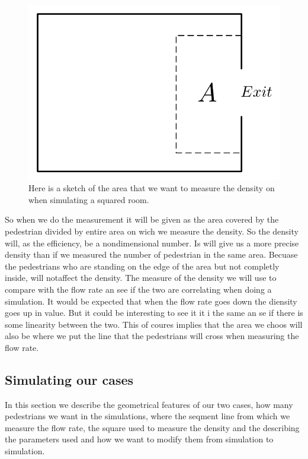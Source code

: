 \begin{figure}
\centering
\includegraphics[scale=.5]{Figures/SquareCase.pdf}
\caption{Here is a sketch of the area that we want to measure the density on when simulating a squared room.}
\label{fig:density}
\end{figure}

So when we do the measurement it will be given as the area covered by the pedestrian 
divided by entire area on wich we measure the density. So the density will, as the 
efficiency, be a nondimensional number. Is will give us a more precise density than 
if we measured the number of pedestrian in the same area.  Becuase the pedestrians 
who are standing on the edge of the area but not completly inside, will notaffect 
the density. The measure of the density we will use to compare with the flow rate 
an see if the two are correlating when doing a simulation. It would be expected 
that when the flow rate goes down the diensity goes up in value. But it could be 
interesting to see it it i the same an se if there is some linearity between the 
two. This of coures implies that the area we choos will also be where we put the 
line that the pedestrians will cross when measuring the flow rate.   

\subsection{Simulating our cases}
In this section we describe the geometrical features of our two cases, how many pedestrians we want in the simulations,
where the seqment line from which we measure the flow rate, the square used to measure the density and the describing the 
parameters used and how we want to modify them from simulation to simulation.

